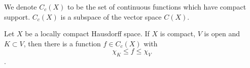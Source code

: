   We denote $C_c(X)$ to be the set of continuous functions which have compact support. $C_c(X)$ is a subspace of the vector space $C(X)$.

\begin{theorem}
  Let $X$ be a locally compact Hausdorff space. If $X$ is compact, $V$ is open and $K \subset V$, then there is a function $f \in C_c(X)$ with $$\chi_K \le f \le \chi_V$$.
\end{theorem}















